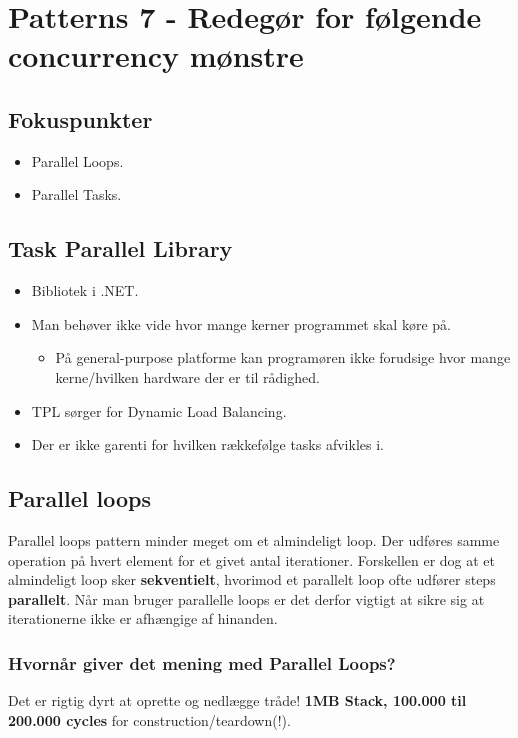 \section{Patterns 7 - Redegør for følgende concurrency mønstre}

\subsection{Fokuspunkter}

\begin{itemize}
	\item Parallel Loops.
	\item Parallel Tasks.
\end{itemize}

\subsection{Task Parallel Library}
\begin{itemize}
	\item Bibliotek i .NET.
	\item Man behøver ikke vide hvor mange kerner programmet skal køre på.
	\begin{itemize}
		\item På general-purpose platforme kan programøren ikke forudsige hvor mange kerne/hvilken hardware der er til rådighed.
	\end{itemize}
	\item TPL sørger for Dynamic Load Balancing.
	\item Der er ikke garenti for hvilken rækkefølge tasks afvikles i. 
\end{itemize}

\subsection{Parallel loops}
Parallel loops pattern minder meget om et almindeligt loop. Der udføres samme operation på hvert element for et givet antal iterationer. Forskellen er dog at et almindeligt loop sker \textbf{sekventielt}, hvorimod et parallelt loop ofte udfører steps \textbf{parallelt}. Når man bruger parallelle loops er det derfor vigtigt at sikre sig at iterationerne ikke er afhængige af hinanden.

\subsubsection{Hvornår giver det mening med Parallel Loops?}
Det er rigtig dyrt at oprette og nedlægge tråde! \textbf{1MB Stack, 100.000 til 200.000 cycles} for construction/teardown(!).

